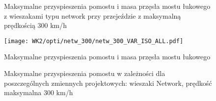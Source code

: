 \begin{figure}[hbt!]
	\centering
	\captionsetup{justification=centering}
	\caption{Maksymalne przyspieszenia pomostu i masa przęsła mostu łukowego z wieszakami typu network przy przejeździe z maksymalną prędkością 300 km/h}
	\label{fig:wk2_opti_netw_300_variables}
\end{figure}
\begin{figure}[hbt!]
	\centering
	\texttt{[image: WK2/opti/netw\_300/netw\_300\_VAR\_ISO\_ALL.pdf]}
	\captionsetup{justification=centering}
	\caption{Maksymalne przyspieszenia pomostu i masa przęsła mostu łukowego }
	\label{fig:wk2_opti_netw_300_vars_all}
\end{figure}
\begin{figure}[hbt!]
	\centering
	\captionsetup{justification=centering}
	\caption{Maksymalne przyspieszenia pomostu w zależności dla poszczególnych zmiennych projektowych: wieszaki Network, prędkość maksymalna 300 km/h}
	\label{fig:wk2_opti_netw_300_var_2d}
\end{figure}

